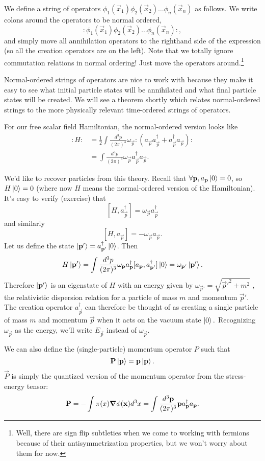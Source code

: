 \begin{defn}
We define a  string of operators $\phi_1(\vec x_1)\phi_2 (\vec x_2)\ldots \phi_n (\vec x_n)$ as follows.
We write colons around the operators to be normal ordered,
$$: \phi_1(\vec x_1)\phi_2 (\vec x_2)\ldots \phi_n (\vec x_n):,$$
and simply move all annihilation operators to the righthand side of the expression (so all the creation operators are on the left). Note that we totally ignore commutation relations in normal ordering! Just move the operators around.\footnote{Well, there are sign flip subtleties when we come to working with fermions because of their antisymmetrization properties, but we won't worry about them for now.} 

Normal-ordered strings of operators are nice to work with because they make it easy to see what initial particle states will be annihilated and what final particle states will be created. We will see a theorem shortly which relates normal-ordered strings to the more physically relevant time-ordered strings of operators.
\end{defn}
\begin{exm}
For our free scalar field Hamiltonian, the normal-ordered version looks like
\begin{align*}
:H:&= \frac{1}{2} \int \frac{d^3p}{(2\pi)^3} \omega_{\vec p} :(a_{\vec p} a_{\vec p}^\dagger + a_{\vec p}^\dagger a_{\vec p}):\\
&=\int \frac{d^3p}{(2\pi)^3} \omega_{\vec p} a_{\vec p}^\dagger a_{\vec p}.
\end{align*}
\end{exm}

We'd like to recover particles from this theory. Recall that $\forall \boldsymbol{\mathbf{p}}, a_{\boldsymbol{\mathbf{p}}}\left| 0 \right>=0$, so $H\left| 0 \right>=0$ (where now $H$ means the normal-ordered version of the Hamiltonian). It's easy to verify (exercise) that
$$[H,a_{\vec p}^\dagger] =\omega_{\vec p} a_{\vec p}^\dagger$$
and similarly
$$[H,a_{\vec p}]=-\omega_{\vec p} a_{\vec p}.$$
Let us define the state $\left| \boldsymbol{\mathbf{p}}' \right>=a^\dagger_{\boldsymbol{\mathbf{p}}'}\left| 0 \right>$. Then
$$H\left| \boldsymbol{\mathbf{p}}' \right>=\int \frac{d^3 p}{(2\pi)^3} \omega_{\boldsymbol{\mathbf{p}}} a_{\boldsymbol{\mathbf{p}}}^\dagger [a_{\boldsymbol{\mathbf{p}}}, a_{\boldsymbol{\mathbf{p}}'}^\dagger]\left| 0 \right>=\omega_{\boldsymbol{\mathbf{p}}'}\left| \boldsymbol{\mathbf{p}}' \right>.$$
Therefore $\left| \boldsymbol{\mathbf{p}}' \right>$ is an eigenstate of $H$ with an energy given by $\omega_{\vec p'}=\sqrt{{\vec p'}^2+m^2}$ , the relativistic dispersion relation for a particle of mass $m$ and momentum $\vec p'$. %
The creation operator $a_{\vec p}^\dagger$ can therefore be thought of as creating a single particle of mass $m$ and momentum $\vec p$ when it acts on the vacuum state $\left| 0 \right>.$
Recognizing $\omega_{\vec p}$ as the energy, we'll write $E_{\vec p}$ instead of $\omega_{\vec p}$.

We can also define the (single-particle) momentum operator $P$ such that
$$\boldsymbol{\mathbf{P}}\left| \boldsymbol{\mathbf{p}} \right>=\boldsymbol{\mathbf{p}}\left| \boldsymbol{\mathbf{p}} \right>.$$
$\vec P$ is simply the quantized version of the momentum operator from the stress-energy tensor:
$$\boldsymbol{\mathbf{P}} =-\int \pi(x) \mbox{\boldmath$ \nabla $} \phi(\boldsymbol{\mathbf{x}})d^3 x=\int \frac{d^3 \boldsymbol{\mathbf{p}}}{(2\pi)^3} \boldsymbol{\mathbf{p}} a^\dagger_{\boldsymbol{\mathbf{p}}}a _{\boldsymbol{\mathbf{p}}}.$$